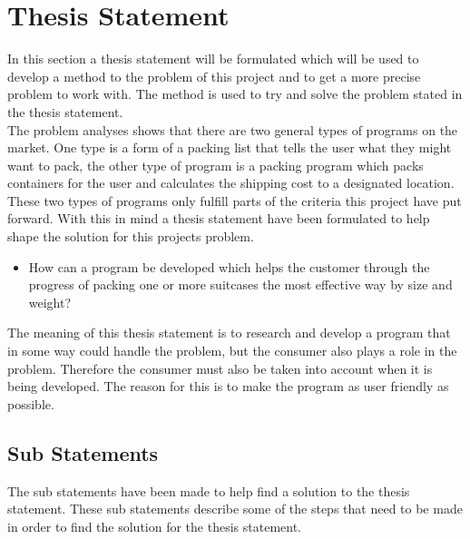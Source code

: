 \section{Thesis Statement}
In this section a thesis statement will be formulated which will be used to develop a method to the problem of this project and to get a more precise problem to work with. The method is used to try and solve the problem stated in the thesis statement.\\
The problem analyses shows that there are two general types of programs on the market. One type is a form of a packing list that tells the user what they might want to pack, the other type of program is a packing program which packs containers for the user and calculates the shipping cost to a designated location. These two types of programs only fulfill parts of the criteria this project have put forward. With this in mind a thesis statement have been formulated to help shape the solution for this projects problem.

\begin{itemize}
\item How can a program be developed which helps the customer through the progress of packing one or more suitcases the most effective way by size and weight?
\end{itemize}

The meaning of this thesis statement is to research and develop a program that in some way could handle the problem, but the consumer also plays a role in the problem.
Therefore the consumer must also be taken into account when it is being developed. The reason for this is to make the program as user friendly as possible.

\subsection*{Sub Statements}
The sub statements have been made to help find a solution to the thesis statement. These sub statements describe some of the steps that need to be made in order to find the solution for the thesis statement.

